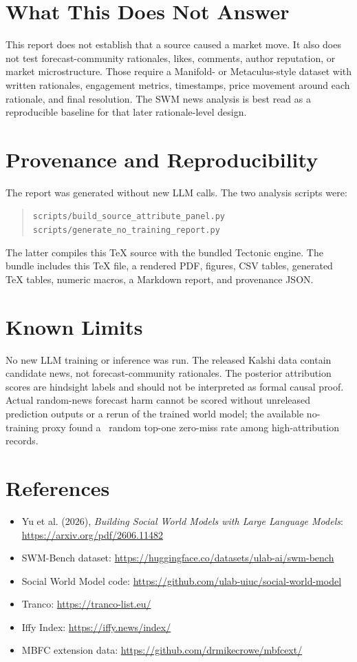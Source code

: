 \documentclass[11pt]{article}
\begin{document}
\section{What This Does Not Answer}
This report does not establish that a source caused a market move. It also does not test forecast-community rationales, likes, comments, author reputation, or market microstructure. Those require a Manifold- or Metaculus-style dataset with written rationales, engagement metrics, timestamps, price movement around each rationale, and final resolution. The SWM news analysis is best read as a reproducible baseline for that later rationale-level design.
\clearpage
\appendix
\section{Provenance and Reproducibility}
The report was generated without new LLM calls. The two analysis scripts were:
\begin{quote}
\small\texttt{scripts/build\_source\_attribute\_panel.py}\\
\small\texttt{scripts/generate\_no\_training\_report.py}
\end{quote}
The latter compiles this TeX source with the bundled Tectonic engine. The bundle includes this TeX file, a rendered PDF, figures, CSV tables, generated TeX tables, numeric macros, a Markdown report, and provenance JSON.
\section{Known Limits}
No new LLM training or inference was run. The released Kalshi data contain candidate news, not forecast-community rationales. The posterior attribution scores are hindsight labels and should not be interpreted as formal causal proof. Actual random-news forecast harm cannot be scored without unreleased prediction outputs or a rerun of the trained world model; the available no-training proxy found a \RandomTopOneZeroMissRate\ random top-one zero-miss rate among high-attribution records.
\section{References}
\begin{itemize}
\item Yu et al. (2026), \textit{Building Social World Models with Large Language Models}: \url{https://arxiv.org/pdf/2606.11482}
\item SWM-Bench dataset: \url{https://huggingface.co/datasets/ulab-ai/swm-bench}
\item Social World Model code: \url{https://github.com/ulab-uiuc/social-world-model}
\item Tranco: \url{https://tranco-list.eu/}
\item Iffy Index: \url{https://iffy.news/index/}
\item MBFC extension data: \url{https://github.com/drmikecrowe/mbfcext/}
\end{itemize}
\end{document}
